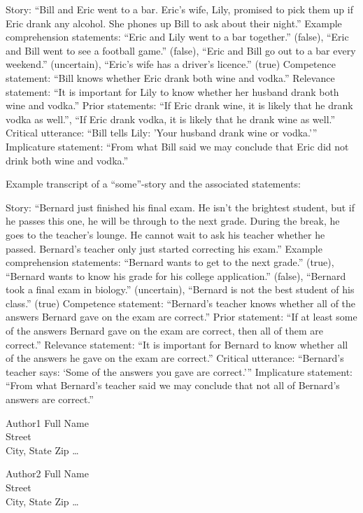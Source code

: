 \documentclass{sp}
\begin{document}
Story: “Bill and Eric went to a bar. Eric’s wife, Lily, promised to pick them up if Eric drank any alcohol. She phones up Bill to ask about their night.”
Example comprehension statements: “Eric and Lily went to a bar together.” (false), “Eric and Bill went to see a football game.” (false), “Eric and Bill go out to a bar every weekend.” (uncertain), “Eric's wife has a driver’s licence.” (true)
Competence statement: “Bill knows whether Eric drank both wine and vodka.”
Relevance statement: “It is important for Lily to know whether her husband drank both wine and vodka.”
Prior statements: “If Eric drank wine, it is likely that he drank vodka as well.”, “If Eric drank vodka, it is likely that he drank wine as well.”
Critical utterance: “Bill tells Lily: 'Your husband drank wine or vodka.'”
Implicature statement: “From what Bill said we may conclude that Eric did not drink both wine and vodka.”

Example transcript of a “some”-story and the associated statements:

Story: “Bernard just finished his final exam. He isn't the brightest student, but if he passes this one, he will be through to the next grade. During the break, he goes to the teacher's lounge. He cannot wait to ask his teacher whether he passed. Bernard's teacher only just started correcting his exam.”
Example comprehension statements: “Bernard wants to get to the next grade.” (true), “Bernard wants to know his grade for his college application.” (false), “Bernard took a final exam in biology.” (uncertain), “Bernard is not the best student of his class.” (true)
Competence statement: “Bernard’s teacher knows whether all of the answers Bernard gave on the exam are correct.”
Prior statement: “If at least some of the answers Bernard gave on the exam are correct, then all of them are correct.”
Relevance statement: “It is important for Bernard to know whether all of the answers he gave on the exam are correct.”
Critical utterance: “Bernard’s teacher says: ‘Some of the answers you gave are correct.’”
Implicature statement: “From what Bernard’s teacher said we may conclude that not all of Bernard’s answers are correct.”




\begin{addresses}
  \begin{address}
    Author1 Full Name \\
    Street \\
    City, State Zip \ldots \\
  \end{address}
  \begin{address}
    Author2 Full Name \\
    Street \\
    City, State Zip \dots \\
  \end{address}
\end{addresses}
\end{document}
